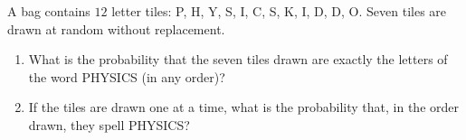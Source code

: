 A bag contains $12$ letter tiles: P, H, Y, S, I, C, S, K, I, D, D, O. Seven tiles are drawn at random without replacement.
\begin{enumerate}
\item[(a)] What is the probability that the seven tiles drawn are exactly the letters of the word PHYSICS (in any order)?
\item[(b)] If the tiles are drawn one at a time, what is the probability that, in the order drawn, they spell PHYSICS?
\end{enumerate}
